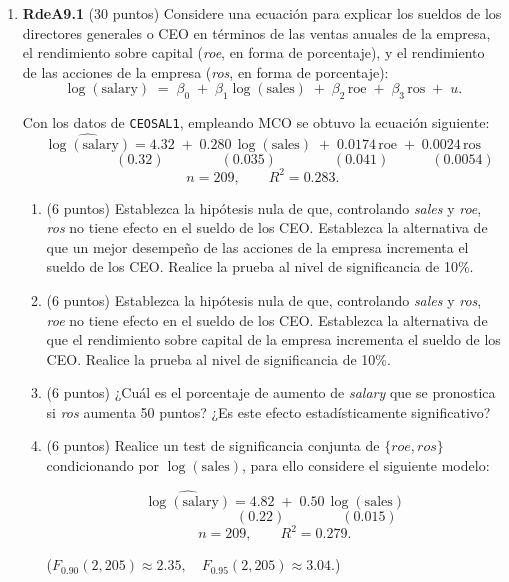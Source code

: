 \documentclass[10pt,a4paper]{article}
\begin{document}
\begin{enumerate}
 \item \textbf{RdeA9.1} (30 puntos) 
 Considere una ecuación para explicar los sueldos de los directores generales o CEO en términos de las ventas anuales de la empresa, el rendimiento sobre capital (\emph{roe}, en forma de porcentaje), y el rendimiento de las acciones de la empresa (\emph{ros}, en forma de porcentaje):
\[
\log(\text{salary}) \;=\; \beta_0 \;+\; \beta_1 \log(\text{sales}) \;+\; \beta_2 \,\text{roe} \;+\; \beta_3 \,\text{ros} \;+\; u.
\]


 Con los datos de \texttt{CEOSAL1}, empleando MCO se obtuvo la ecuación siguiente:
\[
\widehat{\log(\text{salary})}
= 4.32 \;+\; 0.280\,\log(\text{sales}) \;+\; 0.0174\,\text{roe} \;+\; 0.0024\,\text{ros}
\]
\[
\qquad\qquad \qquad(0.32)\qquad \qquad(0.035)\qquad\qquad(0.041)\qquad\quad (0.0054)
\]
\[
n = 209,\qquad R^2 = 0.283.
\]

\begin{enumerate}
\item (6 puntos) Establezca la hipótesis nula de que, controlando \textit{sales} y \textit{roe}, \textit{ros} no tiene efecto en el sueldo de los CEO. Establezca la alternativa de que un mejor desempeño de las acciones de la empresa incrementa el sueldo de los CEO.  Realice la prueba al nivel de significancia de 10\%.

\item (6 puntos) Establezca la hipótesis nula de que, controlando \textit{sales} y \textit{ros}, \textit{roe} no tiene efecto en el sueldo de los CEO. Establezca la alternativa de que el rendimiento sobre capital de la empresa incrementa el sueldo de los CEO.  Realice la prueba al nivel de significancia de 10\%.

\item (6 puntos) ¿Cuál es el porcentaje de aumento de \textit{salary} que se pronostica si \textit{ros} aumenta 50 puntos?  ¿Es este efecto estadísticamente significativo?

\item (6 puntos)  Realice un {test} de {significancia conjunta} de \(\{\textit{roe},\textit{ros}\}\) condicionando por \(\log(\text{sales})\), para ello considere el siguiente modelo: 


\[
\widehat{\log(\text{salary})}
= 4.82 \;+\; 0.50\,\log(\text{sales}) 
\]
\[
\qquad\qquad \qquad(0.22)\qquad \qquad(0.015)
\]
\[
n = 209,\qquad R^2 = 0.279.
\]


 ($
F_{0.90}(2,205)\approx 2.35,
\quad
F_{0.95}(2,205)\approx 3.04.
$)


\end{enumerate}
\end{enumerate}
\end{document}
